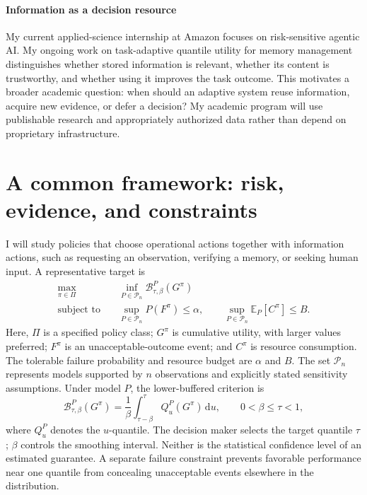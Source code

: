 \documentclass[11pt,letterpaper]{article}
\begin{document}
\paragraph{Information as a decision resource}
My current applied-science internship at Amazon focuses on risk-sensitive
agentic AI. My ongoing work on task-adaptive quantile utility for memory
management distinguishes whether stored information is relevant, whether
its content is trustworthy, and whether using it improves the task
outcome. This motivates a broader academic question: when should an
adaptive system reuse information, acquire new evidence, or defer a
decision? My academic program will use publishable research and
appropriately authorized data rather than depend on proprietary
infrastructure.

\section{A common framework: risk, evidence, and constraints}

I will study policies that choose operational actions together with
information actions, such as requesting an observation, verifying a
memory, or seeking human input. A representative target is
\begin{equation}
\begin{aligned}
\max_{\pi\in\Pi}\quad
    &\inf_{P\in\mathcal{P}_n}
      \mathcal{B}^{P}_{\tau,\beta}(G^{\pi})
    \\
\text{subject to}\quad
    &\sup_{P\in\mathcal{P}_n}P(F^{\pi})\leq\alpha,
    \qquad
    \sup_{P\in\mathcal{P}_n}
    \mathbb{E}_{P}[C^{\pi}]\leq B.
\end{aligned}
\label{eq:agenda}
\end{equation}
Here, $\Pi$ is a specified policy class; $G^{\pi}$ is cumulative utility,
with larger values preferred; $F^{\pi}$ is an unacceptable-outcome event;
and $C^{\pi}$ is resource consumption. The tolerable failure probability
and resource budget are $\alpha$ and $B$. The set $\mathcal{P}_n$
represents models supported by $n$ observations and explicitly stated
sensitivity assumptions. Under model $P$, the lower-buffered criterion is
\[
\mathcal{B}^{P}_{\tau,\beta}(G^{\pi})
    =
    \frac{1}{\beta}
    \int_{\tau-\beta}^{\tau}
    Q^{P}_{u}(G^{\pi})\,\mathrm{d}u,
\qquad
0<\beta\leq\tau<1,
\]
where $Q^{P}_{u}$ denotes the $u$-quantile. The decision maker selects the
target quantile $\tau$; $\beta$ controls the smoothing interval. Neither
is the statistical confidence level of an estimated guarantee. A separate
failure constraint prevents favorable performance near one quantile from
concealing unacceptable events elsewhere in the distribution.
\end{document}
